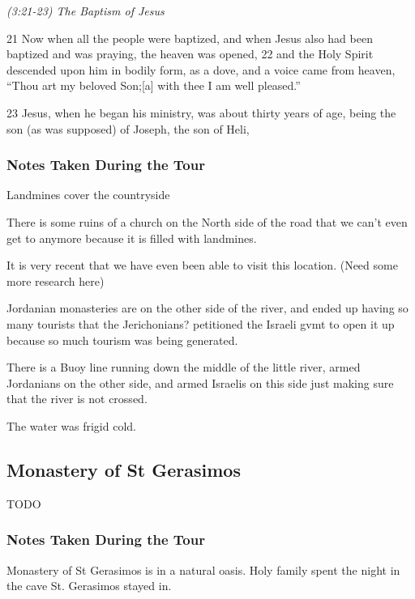 \documentclass[letterpaper]{report}
\begin{document}
{\centering
	\emph{(3:21-23) The Baptism of Jesus}\\
}
\begin{multicols}{2}
21 Now when all the people were baptized, and when Jesus also had been baptized and was praying, the heaven was opened, 22 and the Holy Spirit descended upon him in bodily form, as a dove, and a voice came from heaven, “Thou art my beloved Son;[a] with thee I am well pleased.”

23 Jesus, when he began his ministry, was about thirty years of age, being the son (as was supposed) of Joseph, the son of Heli,
\end{multicols}

\subsubsection{Notes Taken During the Tour}
Landmines cover the countryside

There is some ruins of a church on the North side of the road that we can't even
get to anymore because it is filled with landmines.

It is very recent that we have even been able to visit this location. (Need some more research here)

Jordanian monasteries are on the other side of the river,
and ended up having so many tourists that the Jerichonians? petitioned the Israeli gvmt to open it up because so much tourism was being generated.

There is a Buoy line running down the middle of the little river, armed Jordanians on the other side,
and armed Israelis on this side just making sure that the river is not crossed.

The water was frigid cold.

\clearpage
\subsection{Monastery of St Gerasimos}
\begin{multicols}{2}
	\mbox{}TODO
\end{multicols}

\subsubsection{Notes Taken During the Tour}
Monastery of St Gerasimos is in a natural oasis.
Holy family spent the night in the cave St. Gerasimos stayed in.
\end{document}
